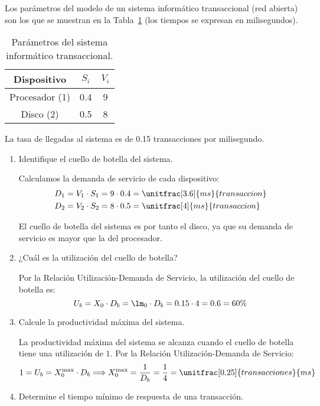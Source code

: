 \begin{ejercicio}\label{ej:5.12}
    Los parámetros del modelo de un sistema informático transaccional (red abierta) son los que se muestran en la Tabla~\ref{tab:5.12} (los tiempos se expresan en milisegundos).
    \begin{table}[h]
        \centering
        \begin{tabular}{|c|c|c|}
            \hline
            Dispositivo & $S_i$ & $V_i$ \\
            \hline
            Procesador (1) & 0.4 & 9 \\
            Disco (2) & 0.5 & 8 \\
            \hline
        \end{tabular}
        \caption{Parámetros del sistema informático transaccional.}
        \label{tab:5.12}
    \end{table}
    La tasa de llegadas al sistema es de 0.15 transacciones por milisegundo.
    \begin{enumerate}
        \item Identifique el cuello de botella del sistema.
        
        Calculamos la demanda de servicio de cada dispositivo:
        \begin{align*}
            D_1 &= V_1 \cdot S_1 = 9 \cdot 0.4 = \unitfrac[3.6]{ms}{transaccion} \\
            D_2 &= V_2 \cdot S_2 = 8 \cdot 0.5 = \unitfrac[4]{ms}{transaccion}
        \end{align*}

        El cuello de botella del sistema es por tanto el disco, ya que su demanda de servicio es mayor que la del procesador.
        \item ¿Cuál es la utilización del cuello de botella?
        
        Por la Relación Utilización-Demanda de Servicio, la utilización del cuello de botella es:
        \begin{equation*}
            U_b = X_0 \cdot D_b = \lm_0 \cdot D_b = 0.15 \cdot 4 = 0.6 = 60\%
        \end{equation*}
        \item Calcule la productividad máxima del sistema.
        
        La productividad máxima del sistema se alcanza cuando el cuello de botella tiene una utilización de $1$. Por la Relación Utilización-Demanda de Servicio:
        \begin{align*}
            1 = U_b = X_0^{\text{max}} \cdot D_b
            \Longrightarrow X_0^{\text{max}} = \dfrac{1}{D_b} = \dfrac{1}{4} = \unitfrac[0.25]{transacciones}{ms}
        \end{align*}
        \item Determine el tiempo mínimo de respuesta de una transacción.
        

\end{enumerate}
\end{ejercicio}
